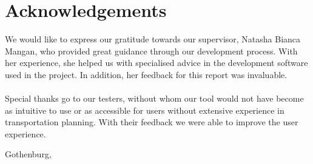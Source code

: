 \thispagestyle{plain}
\section*{Acknowledgements}
    We would like to express our gratitude towards our supervisor, Natasha Bianca Mangan, who provided great guidance through our development process. With her experience, she helped us with specialised advice in the development software used in the project. In addition, her feedback for this report was invaluable.
    \\\\
    Special thanks go to our testers, without whom our tool would not have become as intuitive to use or as accessible for users without extensive experience in transportation planning. With their feedback we were able to improve the user experience.

\vspace{1.5cm}
\hfill
\membertildelist{} Gothenburg, \monthname \space \the\year

\newpage